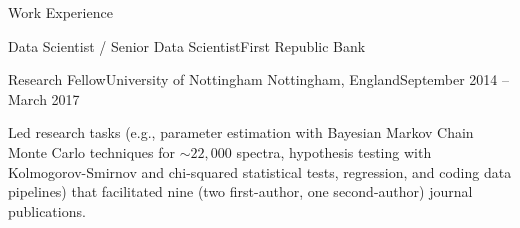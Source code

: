 \documentclass{article}
\newlength{\tabin}
\newlength{\secsep}
\newcommand{\lineunder}{\vspace*{-8pt} \\ \hspace*{-6pt} \hrulefill \\ \vspace*{-15pt}}
\newenvironment{tabbedsection}[1]{
  \begin{list}{}{
      \setlength{\itemsep}{0pt}
      \setlength{\labelsep}{0pt}
      \setlength{\labelwidth}{0pt}
      \setlength{\leftmargin}{\tabin}
      \setlength{\rightmargin}{\tabin}
      \setlength{\listparindent}{0pt}
      \setlength{\parsep}{0pt}
      \setlength{\parskip}{0pt}
      \setlength{\partopsep}{0pt}
      \setlength{\topsep}{#1}
    }
  \item[]
}{\end{list}}
\newenvironment{resume_section}[1]{
  \filbreak
  \vspace{2\secsep}
  \textsc{\large#1}
  \lineunder
  \begin{tabbedsection}{\secsep}
}{\end{tabbedsection}}
\newenvironment{subitems}{
  \renewcommand{\labelitemi}{-}
  \begin{itemize}
      \setlength{\labelsep}{1em}
}{\end{itemize}}
\newenvironment{resume_employer}[4]{
  \vspace{\secsep}
  \textbf{#1} \\ 
  \indent {\small #2} \hfill {\footnotesize#3 (#4)}
  \begin{tabbedsection}{0pt}
  \begin{subitems}
}{\end{subitems}\end{tabbedsection}}
\begin{document}
\begin{resume_section}{Work Experience}
\begin{resume_employer}{Data Scientist / Senior Data Scientist}{First Republic Bank}
  \end{resume_employer}

  \begin{resume_employer}{Research Fellow}{University of Nottingham}
  {Nottingham, England}{September 2014 -- March 2017}
    \item Led research tasks (e.g., parameter estimation with Bayesian Markov Chain Monte Carlo techniques for $\sim22,000$ spectra, hypothesis testing with Kolmogorov-Smirnov and chi-squared statistical tests, regression, and coding data pipelines) that facilitated nine (two first-author, one second-author) journal publications.
  \end{resume_employer}


\end{resume_section}
\end{document}
